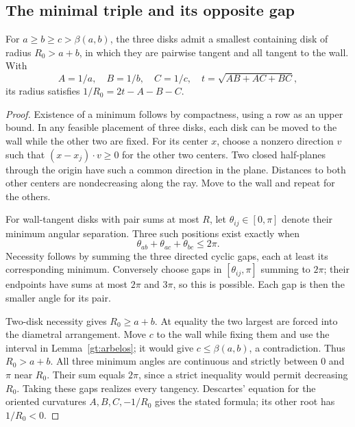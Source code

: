 \subsection{The minimal triple and its opposite gap}

\begin{lemma}\label{gt:minimal}
For $a\ge b\ge c>\beta(a,b)$, the three disks admit a smallest
containing disk of radius $R_0>a+b$, in which they are pairwise tangent
and all tangent to the wall. With
\[
 A=1/a,\quad B=1/b,\quad C=1/c,\quad t=\sqrt{AB+AC+BC},
\]
its radius satisfies $1/R_0=2t-A-B-C$.
\end{lemma}
\begin{proof}
Existence of a minimum follows by compactness, using a row as an upper
bound. In any feasible placement of three disks, each disk can be moved
to the wall while the other two are fixed. For its center $x$, choose
a nonzero direction $v$ such that $(x-x_j)\cdot v\ge0$ for the
other two centers. Two closed half-planes through the origin have such
a common direction in the plane. Distances to both other centers are
nondecreasing along the ray. Move to the wall and repeat for the others.

For wall-tangent disks with pair sums at most $R$, let
$\theta_{ij}\in[0,\pi]$ denote their minimum angular separation.
Three such positions exist exactly when
\[
 \theta_{ab}+\theta_{ac}+\theta_{bc}\le2\pi.
\]
Necessity follows by summing the three directed cyclic gaps, each at
least its corresponding minimum. Conversely choose gaps in
$[\theta_{ij},\pi]$ summing to $2\pi$; their endpoints have sums
at most $2\pi$ and $3\pi$, so this is possible. Each gap is then
the smaller angle for its pair.

Two-disk necessity gives $R_0\ge a+b$. At equality the two largest
are forced into the diametral arrangement. Move $c$ to the wall while
fixing them and use the interval in Lemma~\ref{gt:arbelos}; it would
give $c\le\beta(a,b)$, a contradiction. Thus $R_0>a+b$. All three
minimum angles are continuous and strictly between $0$ and $\pi$
near $R_0$. Their sum equals $2\pi$, since a strict inequality would
permit decreasing $R_0$. Taking these gaps realizes every tangency.
Descartes' equation for the oriented curvatures $A,B,C,-1/R_0$ gives
the stated formula; its other root has $1/R_0<0$.
\end{proof}

